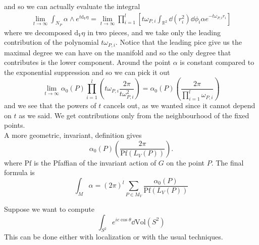 \documentclass[11pt]{article}
\theoremstyle{definition}
\numberwithin{equation}{section}
\newcommand{\ddv}{\mathrm{d}_V}
\begin{document}
and so we can actually evaluate the integral
\begin{align}
	\lim_{t\rightarrow\infty}\int_{N_{P}}\alpha\wedge e^{t\ddv \eta} = \lim_{t\rightarrow\infty}\prod_{i=1}^{l}\left[t\omega_{P,i}\int_{\mathbb{R}^{2}}\dd(r_{i}^{2})\dd{\phi_{i}}\alpha e^{-t\omega_{P,i}r_{i}}\right]
\end{align}
where we decomposed $\ddv\eta$ in two pieces, and we take only the leading contribution of the polynomial $t\omega_{P,i}$. Notice that the leading pice give us the maximal degree we can have on the manifold and so the only degree that contributes is the lower component. Around the point $\alpha$ is constant compared to the exponential suppression and so we can pick it out
\begin{equation}
	\lim_{t\rightarrow\infty} \alpha_{0}(P)\prod_{i=1}^{l}\left( t\omega_{P,i}\frac{2\pi}{t\omega_{P,i}^{2}}\right)=\alpha_{0}(P)\left(\frac{2\pi}{\prod_{i=1}^{l}\omega_{P,i}}\right)
\end{equation}
and we see that the powers of $t$ cancels out, as we wanted since it cannot depend on $t$ as we said. We get contributions only from the neighbourhood of the fixed points.\\
A more geometric, invariant, definition gives
\begin{equation}
	\alpha_{0}(P)\left(\frac{2\pi}{\text{Pf}(L_{V}(P))}\right).
\end{equation}
where $\text{Pf}$ is the Pfaffian of the invariant action of $G$ on the point $P$. The final formula is
\begin{equation}
	\int_{M}\alpha= (2\pi)^{l}\sum_{P\in M_{V}}\frac{\alpha_{0}(P)}{\text{Pf}(L_{V}(P))}
\end{equation}


Suppose we want to compute
\begin{equation}
	\int_{S^{2}}e^{ic\cos\theta}\dd\text{Vol}(S^{2})
\end{equation}
This can be done either with localization or with the usual techniques.
\end{document}
